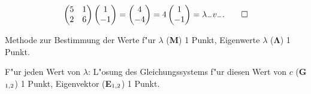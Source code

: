 \begin{loesung}
\begin{align*}
\begin{pmatrix}
5&1\\
2&6
\end{pmatrix}
\begin{pmatrix}1\\-1\end{pmatrix}
=
\begin{pmatrix}4\\-4\end{pmatrix}
=
4\begin{pmatrix}1\\-1\end{pmatrix}
=
\lambda_-v_-.
\qedhere
\end{align*}
\end{loesung}

\begin{bewertung}
\begin{teilaufgaben}
\item
Methode zur Bestimmung der Werte f"ur $\lambda$ ({\bf M}) 1 Punkt,
Eigenwerte $\lambda$ ($\bm{\Lambda}$) 1 Punkt.
\item
F"ur jeden Wert von $\lambda$: L"osung des Gleichungssystems f"ur diesen
Wert von $c$ 
({\bf G$\mathstrut_{1,2}$}) 1 Punkt, Eigenvektor ({\bf E$\mathstrut_{1,2}$})
1 Punkt.
\end{teilaufgaben}
\end{bewertung}


